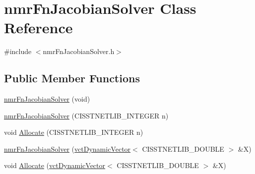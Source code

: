 \hypertarget{classnmr_fn_jacobian_solver}{}\section{nmr\+Fn\+Jacobian\+Solver Class Reference}
\label{classnmr_fn_jacobian_solver}


{\ttfamily \#include $<$nmr\+Fn\+Jacobian\+Solver.\+h$>$}

\subsection*{Public Member Functions}
\begin{DoxyCompactItemize}
\item 
\hyperlink{classnmr_fn_jacobian_solver_a42945a9762a21086dbed694fb2eae847}{nmr\+Fn\+Jacobian\+Solver} (void)
\item 
\hyperlink{classnmr_fn_jacobian_solver_a093c7f03d142c70a018d1fd197204e9a}{nmr\+Fn\+Jacobian\+Solver} (C\+I\+S\+S\+T\+N\+E\+T\+L\+I\+B\+\_\+\+I\+N\+T\+E\+G\+E\+R n)
\item 
void \hyperlink{classnmr_fn_jacobian_solver_a24d51b6d33d9e14fe233dd3c5346bf97}{Allocate} (C\+I\+S\+S\+T\+N\+E\+T\+L\+I\+B\+\_\+\+I\+N\+T\+E\+G\+E\+R n)
\end{DoxyCompactItemize}
{\bf }\par
\begin{DoxyCompactItemize}
\item 
\hyperlink{classnmr_fn_jacobian_solver_a4cb9401ac4fde1fbfedd87ca8ab3290a}{nmr\+Fn\+Jacobian\+Solver} (\hyperlink{classvct_dynamic_vector}{vct\+Dynamic\+Vector}$<$ C\+I\+S\+S\+T\+N\+E\+T\+L\+I\+B\+\_\+\+D\+O\+U\+B\+L\+E $>$ \&X)
\end{DoxyCompactItemize}

{\bf }\par
\begin{DoxyCompactItemize}
\item 
void \hyperlink{classnmr_fn_jacobian_solver_a9c3cebdf5c983c51380cae418739cf34}{Allocate} (\hyperlink{classvct_dynamic_vector}{vct\+Dynamic\+Vector}$<$ C\+I\+S\+S\+T\+N\+E\+T\+L\+I\+B\+\_\+\+D\+O\+U\+B\+L\+E $>$ \&X)
\end{DoxyCompactItemize}

